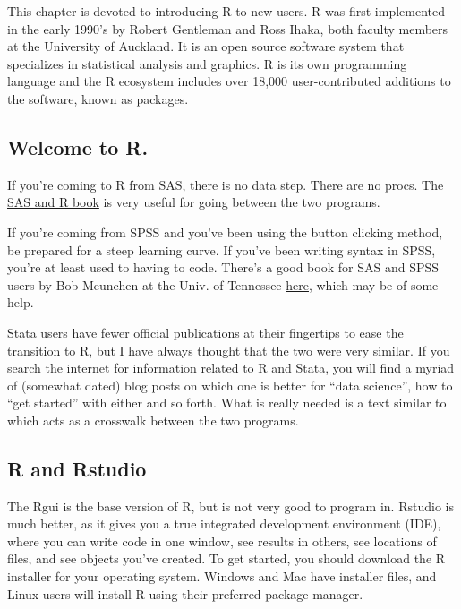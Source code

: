 \documentclass[
]{article}
\begin{document}
This chapter is devoted to introducing R to new users. R was first implemented in the early 1990's by Robert Gentleman and Ross Ihaka, both faculty members at the University of Auckland. It is an open source software system that specializes in statistical analysis and graphics. R is its own programming language and the R ecosystem includes over 18,000 user-contributed additions to the software, known as packages.

\hypertarget{welcome-to-r.}{%
\subsection{Welcome to R.}\label{welcome-to-r.}}

If you're coming to R from SAS, there is no data step. There are no
procs. The \href{https://www.amazon.com/gp/product/1466584491/ref=as_li_tl?ie=UTF8\&camp=1789\&creative=390957\&creativeASIN=1466584491\&linkCode=as2\&tag=sasandrblog-20}{SAS and R
book}
\citet{kleinman} is very useful for going between the two programs.

If you're coming from SPSS and you've been using the button clicking
method, be prepared for a steep learning curve. If you've been writing
syntax in SPSS, you're at least used to having to code. There's a good
book for SAS and SPSS users by Bob Meunchen at the Univ. of Tennessee
\href{https://www.amazon.com/SAS-SPSS-Users-Statistics-Computing/dp/1461406846}{here},
which may be of some help.

Stata users have fewer official publications at their fingertips to ease
the transition to R, but I have always thought that the two were very
similar. If you search the internet for information related to R and
Stata, you will find a myriad of (somewhat dated) blog posts on which
one is better for ``data science'', how to ``get started'' with either and
so forth. What is really needed is a text similar to \citet{kleinman} which
acts as a crosswalk between the two programs.

\hypertarget{r-and-rstudio}{%
\subsection{R and Rstudio}\label{r-and-rstudio}}

The Rgui is the base version of R, but is not very good to program in.
Rstudio is much better, as it gives you a true integrated development
environment (IDE), where you can write code in one window, see results
in others, see locations of files, and see objects you've created. To
get started, you should download the R installer for your operating
system. Windows and Mac have installer files, and Linux users will
install R using their preferred package manager.
\end{document}
